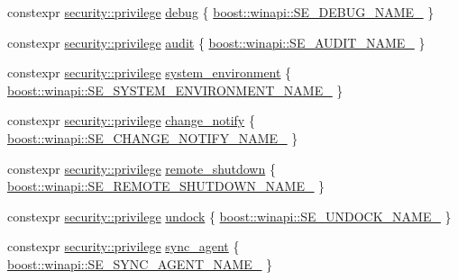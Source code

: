 \begin{DoxyCompactItemize}
constexpr \mbox{\hyperlink{classdistant_1_1security_1_1privilege}{security\+::privilege}} \mbox{\hyperlink{namespacedistant_1_1security_1_1privileges_a06a40bf66742325515163310d27352fd}{debug}} \{ \mbox{\hyperlink{namespaceboost_1_1winapi_a66c159cf8f57c429d60316408747638e}{boost\+::winapi\+::\+S\+E\+\_\+\+D\+E\+B\+U\+G\+\_\+\+N\+A\+M\+E\+\_\+}} \}
\item 
constexpr \mbox{\hyperlink{classdistant_1_1security_1_1privilege}{security\+::privilege}} \mbox{\hyperlink{namespacedistant_1_1security_1_1privileges_abe8f0a3d6fe9358fa2f8ca022a59b997}{audit}} \{ \mbox{\hyperlink{namespaceboost_1_1winapi_a1f2a008a33dfb6f089f034173b880da8}{boost\+::winapi\+::\+S\+E\+\_\+\+A\+U\+D\+I\+T\+\_\+\+N\+A\+M\+E\+\_\+}} \}
\item 
constexpr \mbox{\hyperlink{classdistant_1_1security_1_1privilege}{security\+::privilege}} \mbox{\hyperlink{namespacedistant_1_1security_1_1privileges_a49502a27a41cc1f1f07b54bde8b0d3c5}{system\+\_\+environment}} \{ \mbox{\hyperlink{namespaceboost_1_1winapi_ae7a5b94d22e342ee8040621457878524}{boost\+::winapi\+::\+S\+E\+\_\+\+S\+Y\+S\+T\+E\+M\+\_\+\+E\+N\+V\+I\+R\+O\+N\+M\+E\+N\+T\+\_\+\+N\+A\+M\+E\+\_\+}} \}
\item 
constexpr \mbox{\hyperlink{classdistant_1_1security_1_1privilege}{security\+::privilege}} \mbox{\hyperlink{namespacedistant_1_1security_1_1privileges_a566ea1c28a59ceb8105582cae07418b8}{change\+\_\+notify}} \{ \mbox{\hyperlink{namespaceboost_1_1winapi_a2e0875620298ae82bd13a78ccfde168f}{boost\+::winapi\+::\+S\+E\+\_\+\+C\+H\+A\+N\+G\+E\+\_\+\+N\+O\+T\+I\+F\+Y\+\_\+\+N\+A\+M\+E\+\_\+}} \}
\item 
constexpr \mbox{\hyperlink{classdistant_1_1security_1_1privilege}{security\+::privilege}} \mbox{\hyperlink{namespacedistant_1_1security_1_1privileges_a1a42bee787a5f65817e85d4b69f9b22a}{remote\+\_\+shutdown}} \{ \mbox{\hyperlink{namespaceboost_1_1winapi_a767b78150dc6e2fbfe5d78dc9f1c46cd}{boost\+::winapi\+::\+S\+E\+\_\+\+R\+E\+M\+O\+T\+E\+\_\+\+S\+H\+U\+T\+D\+O\+W\+N\+\_\+\+N\+A\+M\+E\+\_\+}} \}
\item 
constexpr \mbox{\hyperlink{classdistant_1_1security_1_1privilege}{security\+::privilege}} \mbox{\hyperlink{namespacedistant_1_1security_1_1privileges_af807a9fb7ffa80bd7f698978f035636c}{undock}} \{ \mbox{\hyperlink{namespaceboost_1_1winapi_a3953665670c8045805c068852e5ca998}{boost\+::winapi\+::\+S\+E\+\_\+\+U\+N\+D\+O\+C\+K\+\_\+\+N\+A\+M\+E\+\_\+}} \}
\item 
constexpr \mbox{\hyperlink{classdistant_1_1security_1_1privilege}{security\+::privilege}} \mbox{\hyperlink{namespacedistant_1_1security_1_1privileges_a25a7ae4b1a3c96183205f39a3a5997b2}{sync\+\_\+agent}} \{ \mbox{\hyperlink{namespaceboost_1_1winapi_a6cfe2bda14b699274aad9bf64c4d4bc6}{boost\+::winapi\+::\+S\+E\+\_\+\+S\+Y\+N\+C\+\_\+\+A\+G\+E\+N\+T\+\_\+\+N\+A\+M\+E\+\_\+}} \}

\end{DoxyCompactItemize}

